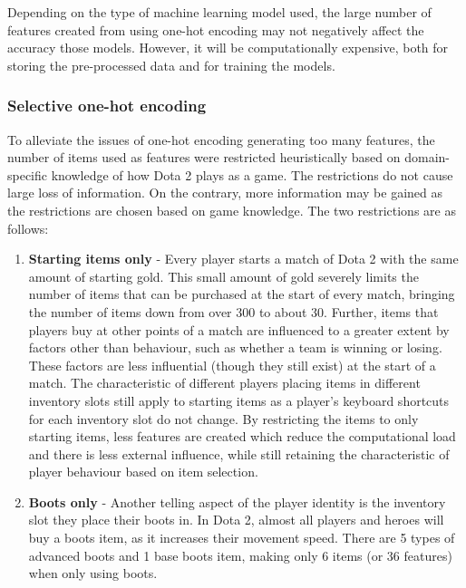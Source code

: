 \documentclass[Report.tex]{subfiles}
\begin{document}
Depending on the type of machine learning model used, the large number of features created from using one-hot encoding may not negatively affect the accuracy those models. However, it will be computationally expensive, both for storing the pre-processed data and for training the models. 


\subsubsection{Selective one-hot encoding}
To alleviate the issues of one-hot encoding generating too many features, the number of items used as features were restricted heuristically based on domain-specific knowledge of how Dota 2 plays as a game. The restrictions do not cause large loss of information. On the contrary, more information may be gained as the restrictions are chosen based on game knowledge. The two restrictions are as follows:
\begin{enumerate}
\item \textbf{Starting items only} - Every player starts a match of Dota 2 with the same amount of starting gold. This small amount of gold severely limits the number of items that can be purchased at the start of every match, bringing the number of items down from over 300 to about 30. Further, items that players buy at other points of a match are influenced to a greater extent by factors other than behaviour, such as whether a team is winning or losing. These factors are less influential (though they still exist) at the start of a match. The characteristic of different players placing items in different inventory slots still apply to starting items as a player's keyboard shortcuts for each inventory slot do not change. By restricting the items to only starting items, less features are created which reduce the computational load and there is less external influence, while still retaining the characteristic of player behaviour based on item selection. 
\item \textbf{Boots only} - Another telling aspect of the player identity is the inventory slot they place their boots in. In Dota 2, almost all players and heroes will buy a boots item, as it increases their movement speed. There are 5 types of advanced boots and 1 base boots item, making only 6 items (or 36 features) when only using boots. 
\end{enumerate}


\end{document}
